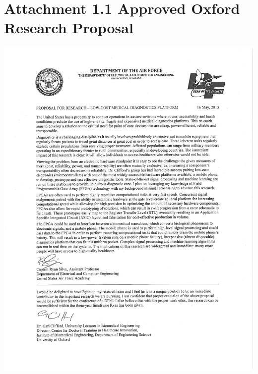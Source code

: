 \documentclass{article}
\begin{document}

\newpage
\section*{Attachment 1.1 \newline Approved Oxford Research Proposal}
\label{sec:prop}
\centering
\vspace{-5mm}
\includegraphics[scale=.85,clip=true,trim=1in .5in 1cm 0.4in]{MFR_ProposalforResearch_SilvaSIGNED.pdf}

\newpage
\end{document}
